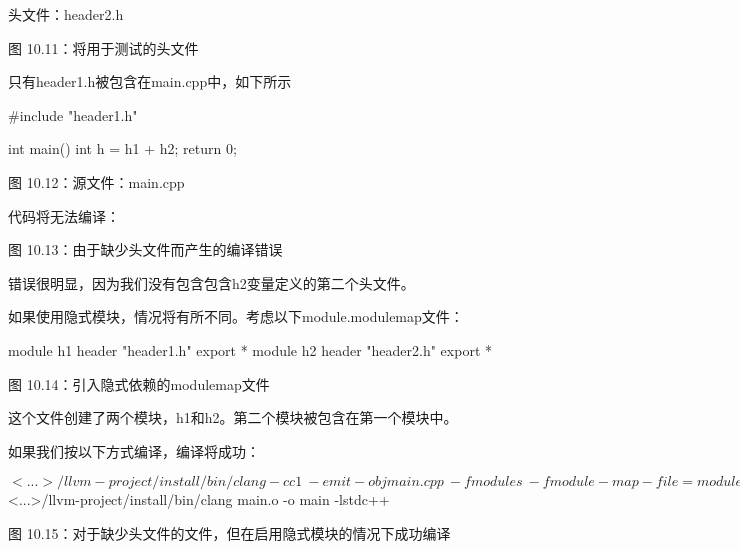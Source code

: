 头文件：header2.h

\begin{center}
图 10.11：将用于测试的头文件
\end{center}

只有header1.h被包含在main.cpp中，如下所示

\begin{cpp}
#include "header1.h"

int main() {
  int h = h1 + h2;
  return 0;
}
\end{cpp}

\begin{center}
图 10.12：源文件：main.cpp
\end{center}

代码将无法编译：


\begin{center}
图 10.13：由于缺少头文件而产生的编译错误
\end{center}

错误很明显，因为我们没有包含包含h2变量定义的第二个头文件。

如果使用隐式模块，情况将有所不同。考虑以下module.modulemap文件：

\begin{cpp}
module h1 {
  header "header1.h"
  export *
  module h2 {
    header "header2.h"
    export *
  }
}
\end{cpp}

\begin{center}
图 10.14：引入隐式依赖的modulemap文件
\end{center}

这个文件创建了两个模块，h1和h2。第二个模块被包含在第一个模块中。

如果我们按以下方式编译，编译将成功：

\begin{shell}
$ <...>/llvm-project/install/bin/clang -cc1 \
        -emit-obj main.cpp                \
        -fmodules                         \
        -fmodule-map-file=module.modulemap\
        -fmodules-cache-path=./cache      \
        -o main.o
$ <...>/llvm-project/install/bin/clang main.o -o main -lstdc++
\end{shell}

\begin{center}
图 10.15：对于缺少头文件的文件，但在启用隐式模块的情况下成功编译
\end{center}

